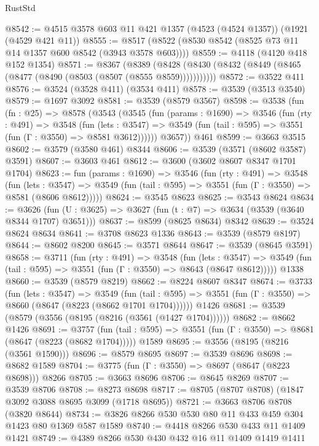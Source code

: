 \begin{lexlean}{RustStd}
\begin{coremodule}
@8542 := @4515 @3578 @603 @11 @421 @1357 (@4523 (@4524 @1357)) (@1921 (@4529 @421 @11))
@8555 := @8517 (@8522 (@8530 @8542 (@8525 @73 @11 @14 @1357 @600 @8542 (@3943 @3578 @603))))
@8559 := @4118 (@4120 @418 @152 @1354)
@8571 := @8367
    (@8389 (@8428 (@8430 (@8432 (@8449 (@8465 (@8477 (@8490 (@8503 (@8507 (@8555 @8559)))))))))))
@8572 := @3522 @411
@8576 := @3524 (@3528 @411) (@3534 @411)
@8578 := @3539 (@3513 @3540)
@8579 := @1697 @3092
@8581 := @3539 (@8579 @3567)
@8598 := @3538
    (fun (fn : @25) =>
    @8578
      (@3543
        (@3545
          (fun (params : @1690) =>
          @3546
            (fun (rty : @491) =>
            @3548
              (fun (lets : @3547) =>
              @3549 (fun (tail : @595) => @3551 (fun (Γ : @3550) => @8581 @3612))))))
        @3657))
    @461
@8599 := @3663 @3515
@8602 := @3579 (@3580 @461) @8344
@8606 := @3539 (@3571 (@8602 @3587) @3591)
@8607 := @3603 @461
@8612 := @3600 (@3602 @8607 @8347 @1701 @1704)
@8623 := fun (params : @1690) =>
  @3546
    (fun (rty : @491) =>
    @3548
      (fun (lets : @3547) =>
      @3549 (fun (tail : @595) => @3551 (fun (Γ : @3550) => @8581 (@8606 @8612)))))
@8624 := @3545 @8623
@8625 := @3543 @8624
@8634 := @3626 (fun (U : @3625) => @3627 (fun (t : @7) => @3634 (@3539 (@3640 @8344 @1707) @3651)))
@8637 := @8599 (@8625 @8634) @8342
@8639 := @3524 @8624 @8634
@8641 := @3708 @8623 @1336
@8643 := @3539 (@8579 @8197)
@8644 := @8602 @8200
@8645 := @3571 @8644
@8647 := @3539 (@8645 @3591)
@8658 := @3711
    (fun (rty : @491) =>
    @3548
      (fun (lets : @3547) =>
      @3549 (fun (tail : @595) => @3551 (fun (Γ : @3550) => @8643 (@8647 @8612)))))
    @1338
@8660 := @3539 (@8579 @8219)
@8662 := @8224 @8607 @8347
@8674 := @3733
    (fun (lets : @3547) =>
    @3549
      (fun (tail : @595) => @3551 (fun (Γ : @3550) => @8660 (@8647 (@8223 (@8662 @1701 @1704))))))
    @1426
@8681 := @3539 (@8579 (@3556 (@8195 (@8216 (@3561 (@1427 @1704))))))
@8682 := @8662 @1426
@8691 := @3757
    (fun (tail : @595) => @3551 (fun (Γ : @3550) => @8681 (@8647 (@8223 (@8682 @1704)))))
    @1589
@8695 := @3556 (@8195 (@8216 (@3561 @1590)))
@8696 := @8579 @8695
@8697 := @3539 @8696
@8698 := @8682 @1589
@8704 := @3775 (fun (Γ : @3550) => @8697 (@8647 (@8223 @8698))) @8266
@8705 := @3663 @8696
@8706 := @8645 @8269
@8707 := @3539 @8706
@8708 := @8273 @8698
@8717 := @8705 (@8707 @8708) (@1847 @3092 @3088 @8695 @3099 (@1718 @8695))
@8721 := @3663 @8706 @8708 (@3820 @8644)
@8734 := @3826 @8266 @530 @530 @80 @11 @433 @459 @304 @1423 @80 @1369 @587 @1589
@8740 := @4418 @8266 @530 @433 @11 @1409 @1421
@8749 := @4389 @8266 @530 @430 @432 @16 @11 @1409 @1419 @1411

\end{coremodule}
\end{lexlean}
